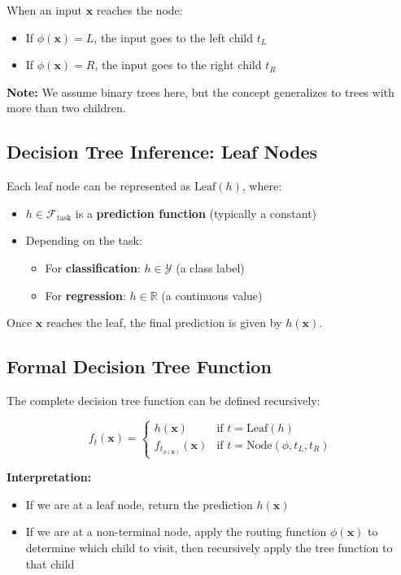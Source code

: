 \documentclass[11pt,a4paper]{article}
\theoremstyle{definition}
\theoremstyle{plain}
\theoremstyle{remark}
\begin{document}
When an input \(\mathbf{x}\) reaches the node:
\begin{itemize}
    \item If \(\phi(\mathbf{x}) = L\), the input goes to the left child \(t_L\)
    \item If \(\phi(\mathbf{x}) = R\), the input goes to the right child \(t_R\)
\end{itemize}

\textbf{Note:} We assume binary trees here, but the concept generalizes to trees with more than two children.

\subsection{Decision Tree Inference: Leaf Nodes}

Each leaf node can be represented as \(\text{Leaf}(h)\), where:

\begin{itemize}
    \item \(h \in \mathcal{F}_{\text{task}}\) is a \textbf{prediction function} (typically a constant)
    \item Depending on the task:
    \begin{itemize}
        \item For \textbf{classification}: \(h \in \mathcal{Y}\) (a class label)
        \item For \textbf{regression}: \(h \in \mathbb{R}\) (a continuous value)
    \end{itemize}
\end{itemize}

Once \(\mathbf{x}\) reaches the leaf, the final prediction is given by \(h(\mathbf{x})\).

\subsection{Formal Decision Tree Function}

The complete decision tree function can be defined recursively:

\[
f_t(\mathbf{x}) = \begin{cases}
h(\mathbf{x}) & \text{if } t = \text{Leaf}(h) \\
f_{t_{\phi(\mathbf{x})}}(\mathbf{x}) & \text{if } t = \text{Node}(\phi, t_L, t_R)
\end{cases}
\]

\textbf{Interpretation:}
\begin{itemize}
    \item If we are at a leaf node, return the prediction \(h(\mathbf{x})\)
    \item If we are at a non-terminal node, apply the routing function \(\phi(\mathbf{x})\) to determine which child to visit, then recursively apply the tree function to that child
\end{itemize}
\end{document}
